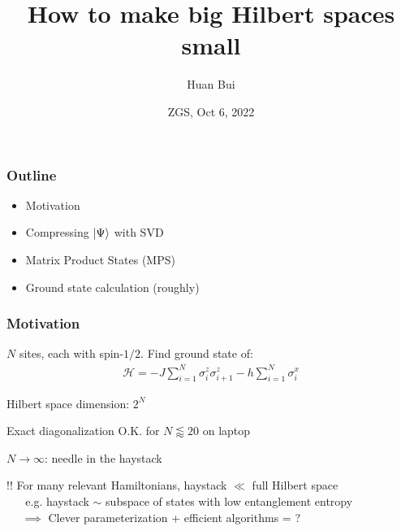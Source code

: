 \documentclass{beamer}
\title[\textcolor{white}{{}}]
{
	How to make big Hilbert spaces small
}
\author[Bui] %
{Huan Bui}
\institute[MIT]{} %
\date{ZGS, Oct 6, 2022}
\theoremstyle{definition}
\begin{document}
 
\frame{\titlepage}

\begin{frame}
	\frametitle{Outline}
	\begin{itemize}
		\item Motivation
		\item Compressing $\ket{\Psi}$ with SVD
		\item Matrix Product States (MPS)
		\item Ground state calculation (roughly)
	\end{itemize}
\end{frame}


\begin{frame}
	\frametitle{Motivation}
	
	$N$ sites, each with spin-$1/2$. Find ground state of:
	\begin{align*}
		\mathcal{H} = - J \sum_{i=1}^N \sigma_i^z \sigma_{i+1}^z - h \sum_{i=1}^N \sigma^x_i
	\end{align*}	
	
	
	Hilbert space dimension: $ 2^N$\\
	
	\vspace{10pt}
	
	Exact diagonalization O.K. for $N \lessapprox 20$ on laptop\\
	
	\vspace{10pt}
	
	$N \to \infty$: needle in the haystack\\
	
	\vspace{10pt}
	
	\pause
	
	{$\boxed{!!}$ For many relevant Hamiltonians, haystack $\ll$ full Hilbert space }\\
	\vspace{5pt}
	{$\quad\,\,\,\,$e.g. haystack $\sim$ subspace of states with low entanglement entropy }\\
	\vspace{5pt}
	{$\quad\,\,\implies$ Clever parameterization + efficient algorithms = \smiley{}?}
	
		
	
\end{frame}
\end{document}
